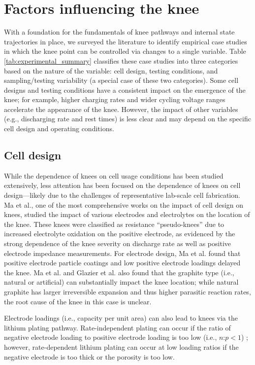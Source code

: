 \documentclass[journal=jpclcd,manuscript=article]{achemso}
\begin{document}
\section{Factors influencing the knee}

With a foundation for the fundamentals of knee pathways and internal state trajectories in place, we surveyed the literature to identify empirical case studies in which the knee point can be controlled via changes to a single variable. Table \ref{tab:experimental_summary} classifies these case studies into three categories based on the nature of the variable: cell design, testing conditions, and sampling/testing variability (a special case of these two categories). Some cell designs and testing conditions have a consistent impact on the emergence of the knee; for example, higher charging rates and wider cycling voltage ranges accelerate the appearance of the knee. However, the impact of other variables (e.g., discharging rate and rest times) is less clear and may depend on the specific cell design and operating conditions.

\subsection{Cell design}

While the dependence of knees on cell usage conditions has been studied extensively, less attention has been focused on the dependence of knees on cell design---likely due to the challenges of representative lab-scale cell fabrication. Ma et al.\cite{ma_editors_2019}{}, one of the most comprehensive works on the impact of cell design on knees, studied the impact of various electrodes and electrolytes on the location of the knee. These knees were classified as resistance ``pseudo-knees'' due to increased electrolyte oxidation on the positive electrode, as evidenced by the strong dependence of the knee severity on discharge rate as well as positive electrode impedance measurements. For electrode design, Ma et al.\cite{ma_editors_2019} found that positive electrode particle coatings and low positive electrode loadings delayed the knee. Ma et al. \cite{ma_editors_2019} and Glazier et al.\cite{glazier_analysis_2017} also found that the graphite type (i.e., natural or artificial) can substantially impact the knee location; while natural graphite has larger irreversible expansion and thus higher parasitic reaction rates\cite{glazier_analysis_2017}{}, the root cause of the knee in this case is unclear.

Electrode loadings (i.e., capacity per unit area) can also lead to knees via the lithium plating pathway.
Rate-independent plating can occur if the ratio of negative electrode loading to positive electrode loading is too low (i.e., $n$:$p< 1$) \cite{deichmann_investigating_2020}; however, rate-dependent lithium plating can occur at low loading ratios if the negative electrode is too thick or the porosity is too low.\cite{waldmann_mechanical_2014, yang_modeling_2017}
\end{document}
